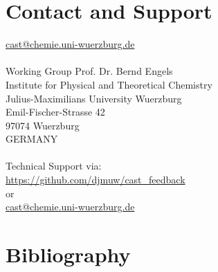 \documentclass[10pt,a4paper]{article} %
\newif\ifdevmode %
\begin{document}
	\newpage
	\section{Contact and Support}
	\label{sec:contact}
	\href{mailto:cast@chemie.uni-wuerzburg.de}{cast@chemie.uni-wuerzburg.de} \ifdevmode \colorbox{red}{we should really acquire this mail adress, better than not having it.} \fi \\~\\

	Working Group Prof. Dr. Bernd Engels\\
	Institute for Physical and Theoretical Chemistry\\
	Julius-Maximilians University Wuerzburg\\
	Emil-Fischer-Strasse 42\\
	97074 Wuerzburg\\
	GERMANY\\~\\
	Technical Support via:\\
	\url{https://github.com/djmuw/cast_feedback}\\
	or\\
	\href{mailto:cast@chemie.uni-wuerzburg.de}{cast@chemie.uni-wuerzburg.de}\\

\newpage
\section{Bibliography}
\printbibliography
\end{document}
